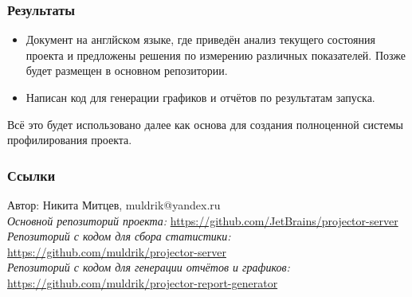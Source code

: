 \documentclass[14pt,aspectratio=169,hyperref={pdftex,unicode},xcolor=dvipsnames]{beamer}
\begin{document}
\begin{frame}
  \frametitle{Результаты}
  \begin{itemize}
    \item Документ на англйском языке, где приведён анализ текущего состояния проекта и предложены решения по измерению различных показателей. Позже будет размещен в основном репозитории.
    \item Написан код для генерации графиков и отчётов по результатам запуска.
  \end{itemize}
  Всё это будет использовано далее как основа для создания полноценной системы профилирования проекта.
  
\end{frame}

\begin{frame}
  \frametitle{Ссылки}
  Автор: Никита Митцев, muldrik@yandex.ru\\
{\small
  \textit{Основной репозиторий проекта:} \href{https://github.com/JetBrains/projector-server}{https://github.com/JetBrains/projector-server}\\
  \textit{Репозиторий с кодом для сбора статистики:} \href{https://github.com/muldrik/projector-server}{https://github.com/muldrik/projector-server}\\
  \textit{Репозиторий с кодом для генерации отчётов и графиков:} \href{https://github.com/muldrik/projector-report-generator}{https://github.com/muldrik/projector-report-generator}
}
\end{frame}
\end{document}
